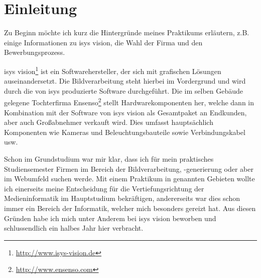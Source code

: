 \chapter{Einleitung}
\label{ch:0}

Zu Beginn möchte ich kurz die Hintergründe meines Praktikums erläutern,
z.B. einige Informationen zu isys vision, die Wahl der Firma und den Bewerbungsprozess.

isys vision\footnote{\url{http://www.isys-vision.de}} ist ein Softwarehersteller, der sich mit grafischen Lösungen auseinandersetzt.
Die Bildverarbeitung steht hierbei im Vordergrund und wird durch die von isys produzierte
Software durchgeführt. Die im selben Gebäude gelegene Tochterfirma Ensenso\footnote{\url{http://www.ensenso.com}} stellt
Hardwarekomponenten her, welche dann in Kombination mit der Software von isys vision
als Gesamtpaket an Endkunden, aber auch Großabnehmer verkauft wird. Dies umfasst
hauptsächlich Komponenten wie Kameras und Beleuchtungsbauteile sowie Verbindungskabel
usw.

Schon im Grundstudium war mir klar, dass ich für mein praktisches Studiensemester
Firmen im Bereich der Bildverarbeitung, -generierung oder aber im Webumfeld suchen
werde. Mit einem Praktikum in genannten Gebieten wollte ich einerseits meine Entscheidung
für die Vertiefungsrichtung der Medieninformatik im Hauptstudium bekräftigen, andererseits
war dies schon immer ein Bereich der Informatik, welcher mich besonders gereizt
hat. Aus diesen Gründen habe ich mich unter Anderem bei isys vision beworben und
schlussendlich ein halbes Jahr hier verbracht.


